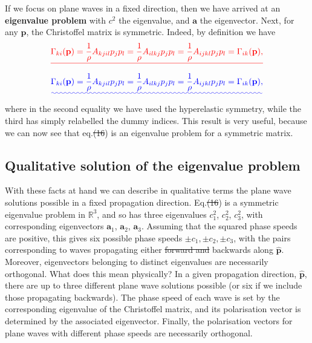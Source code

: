 \documentclass [a4paper,12pt]{paper}
\providecommand{\DIFadd}[1]{{\protect\color{blue}\uwave{#1}}} %
\providecommand{\DIFdel}[1]{{\protect\color{red}\sout{#1}}}                      %
\providecommand{\DIFaddbegin}{} %
\providecommand{\DIFaddend}{} %
\providecommand{\DIFdelbegin}{} %
\providecommand{\DIFdelend}{} %
\begin{document}
If we focus on plane waves in a fixed direction, then we have arrived at an \textbf{eigenvalue problem} with $c^{2}$ the eigenvalue, 
and $\mathbf{a}$ the eigenvector. Next, for any $\mathbf{p}$, the Christoffel matrix is symmetric. Indeed, by definition we have
\DIFdelbegin \begin{displaymath}
\DIFdel{\Gamma_{ki}(\mathbf{p})=\frac{1}{\rho}A_{kjil}p_{j}p_{l}=\frac{1}{\rho}A_{ilkj}p_{j}p_{l}=\frac{1}{\rho}A_{ijkl}p_{j}p_{l}=\Gamma_{ik}(\mathbf{p}),
}\end{displaymath}%
\DIFdelend \DIFaddbegin \begin{equation}
\DIFadd{\Gamma_{ki}(\mathbf{p})=\frac{1}{\rho}A_{kjil}p_{j}p_{l}=\frac{1}{\rho}A_{ilkj}p_{j}p_{l}=\frac{1}{\rho}A_{ijkl}p_{j}p_{l}=\Gamma_{ik}(\mathbf{p}),
\label{eq:17}
}\end{equation}\DIFaddend 
where in the second equality we have used the hyperelastic symmetry, while the third has simply relabelled the dummy indices. 
This result is very useful, because we can now see that eq.\DIFdelbegin \DIFdel{(16}\DIFdelend \DIFaddbegin \DIFadd{~(\ref{eq:16}}\DIFaddend ) is an eigenvalue problem for a symmetric matrix.

\subsection*{Qualitative solution of the eigenvalue problem}

With these facts at hand we can describe in qualitative terms the plane wave solutions possible in a fixed propagation direction. Eq.\DIFdelbegin \DIFdel{(16}\DIFdelend \DIFaddbegin \DIFadd{~(\ref{eq:16}}\DIFaddend ) is a symmetric eigenvalue problem in $\mathbb{R}^{3}$, 
and so has three eigenvalues $c_{1}^{2}$, $c_{2}^{2}$, $c_{3}^{2}$, with corresponding eigenvectors $\mathbf{a}_{1}$, $\mathbf{a}_{2}$, $\mathbf{a}_{3}$. Assuming that the squared phase speeds 
are positive, this gives six possible phase speeds $\pm c_1, \pm c_{2}, \pm c_{3}$, with the pairs corresponding to waves propagating either \DIFdelbegin \DIFdel{forward and }\DIFdelend \DIFaddbegin \DIFadd{forwards or }\DIFaddend backwards along $\hat{\mathbf{p}}$. Moreover, 
eigenvectors belonging to distinct eigenvalues are necessarily orthogonal. What does this mean physically? In a given propagation direction, $\hat{\mathbf{p}}$, there are up to three different plane wave solutions possible (or six if we include those propagating backwards). 
The phase speed of each wave is set by the corresponding eigenvalue of the Christoffel matrix, and its polarisation vector is determined by the associated eigenvector. Finally, the polarisation vectors for plane waves with different phase speeds are necessarily orthogonal.
\end{document}
